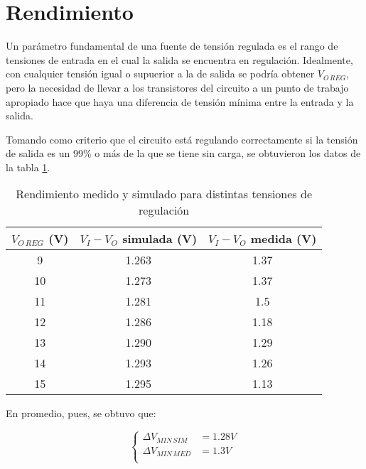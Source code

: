 \documentclass[e2_tp1_main.tex]{subfiles}
\begin{document}
\section{Rendimiento}

Un par\'ametro fundamental de una fuente de tensi\'on regulada es el rango de tensiones de entrada en el cual la salida se encuentra en regulaci\'on. Idealmente, con cualquier tensi\'on igual o supuerior a la de salida se podr\'ia obtener $V_{O\, REG}$, pero la necesidad de llevar a los transistores del circuito a un punto de trabajo apropiado hace que haya una diferencia de tensi\'on m\'inima entre la entrada y la salida. 

Tomando como criterio que el circuito est\'a regulando correctamente si la tensi\'on de salida es un 99\% o m\'as de la que se tiene sin carga, se obtuvieron los datos de la tabla \ref{table:rendimiento}.

\begin{table}[htb!]
\centering
\begin{tabular}{|c||c|c|}
\hline
$V_{O\,REG}$ (V) & $V_I - V_O$ simulada (V) & $V_I - V_O$ medida (V) \\ \hline\hline
9                & 1.263                    & 1.37                   \\ \hline
10               & 1.273                    & 1.37                   \\ \hline
11               & 1.281                    & 1.5                    \\ \hline
12               & 1.286                    & 1.18                   \\ \hline
13               & 1.290                    & 1.29                   \\ \hline
14               & 1.293                    & 1.26                   \\ \hline
15               & 1.295                    & 1.13                   \\ \hline
\end{tabular}
\caption{Rendimiento medido y simulado para distintas tensiones de regulaci\'on}
\label{table:rendimiento}
\end{table}

En promedio, pues, se obtuvo que:

\begin{equation}
	\left\{
	\begin{aligned}
	\Delta V_{MIN\,SIM} &= 1.28V \\ 
	\Delta V_{MIN\,MED} &= 1.3V \\ 
	\end{aligned}
	\right.
\end{equation}
\end{document}
